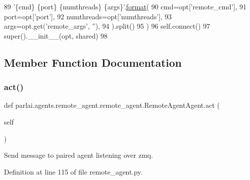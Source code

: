\begin{DoxyCode}
89                     \textcolor{stringliteral}{'\{cmd\} \{port\} \{numthreads\} \{args\}'}.\hyperlink{namespaceparlai_1_1chat__service_1_1services_1_1messenger_1_1shared__utils_a32e2e2022b824fbaf80c747160b52a76}{format}(
90                         cmd=opt[\textcolor{stringliteral}{'remote\_cmd'}],
91                         port=opt[\textcolor{stringliteral}{'port'}],
92                         numthreads=opt[\textcolor{stringliteral}{'numthreads'}],
93                         args=opt.get(\textcolor{stringliteral}{'remote\_args'}, \textcolor{stringliteral}{''}),
94                     ).split()
95                 )
96         self.connect()
97         super().\_\_init\_\_(opt, shared)
98 
\end{DoxyCode}


\subsection{Member Function Documentation}
\mbox{\label{classparlai_1_1agents_1_1remote__agent_1_1remote__agent_1_1RemoteAgentAgent_a8ef2da61732681b2d107032b4a781441}} 
\subsubsection{\texorpdfstring{act()}{act()}}
{\footnotesize\ttfamily def parlai.\+agents.\+remote\+\_\+agent.\+remote\+\_\+agent.\+Remote\+Agent\+Agent.\+act (\begin{DoxyParamCaption}\item[{}]{self }\end{DoxyParamCaption})}

\begin{DoxyVerb}Send message to paired agent listening over zmq.
\end{DoxyVerb}
 

Definition at line 115 of file remote\+\_\+agent.\+py.


